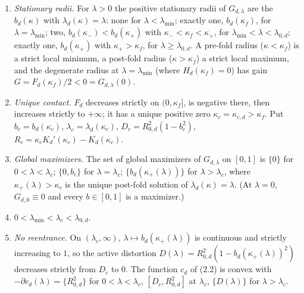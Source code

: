 \documentclass[
  11pt,
  a4paper,
]{article}
\newcounter{none} %
\begin{document}
\begin{enumerate}
\def\labelenumi{(\alph{enumi})}
\item
  \emph{Stationary radii.} For \(\lambda>0\) the positive stationary
  radii of \(G_{d,\allowbreak{}\lambda}\) are the \(b_d(\kappa)\) with
  \(\lambda_d(\kappa)=\lambda\): none for \(\lambda<\lambda_{\min}\);
  exactly one, \(b_d(\kappa_f)\), for \(\lambda=\lambda_{\min}\); two,
  \(b_d(\kappa_-)<b_d(\kappa_+)\) with \(\kappa_-<\kappa_f<\kappa_+\),
  for \(\lambda_{\min}<\lambda<\lambda_{0,\allowbreak{}d}\); exactly one,
  \(b_d(\kappa_+)\) with \(\kappa_+>\kappa_f\), for
  \(\lambda\ge\lambda_{0,\allowbreak{}d}\). A pre-fold radius (\(\kappa<\kappa_f\))
  is a strict local minimum, a post-fold radius (\(\kappa>\kappa_f\)) a
  strict local maximum, and the degenerate radius at
  \(\lambda=\lambda_{\min}\) (where \(H_d(\kappa_f)=0\)) has gain
  \(G=F_d(\kappa_f)/2<0=G_{d,\allowbreak{}\lambda}(0)\).
\item
  \emph{Unique contact.} \(F_d\) decreases strictly on \((0,\allowbreak{}\kappa_f]\),
  is negative there, then increases strictly to \(+\infty\); it has a
  unique positive zero \(\kappa_c=\kappa_{c,\allowbreak{}d}>\kappa_f\). Put
  \(b_c=b_d(\kappa_c)\), \(\lambda_c=\lambda_d(\kappa_c)\),
  \(D_c=R_{0,\allowbreak{}d}^2(1-b_c^2)\),
  \(R_c=\kappa_cK_d'(\kappa_c)-K_d(\kappa_c)\).
\item
  \emph{Global maximizers.} The set of global maximizers of
  \(G_{d,\allowbreak{}\lambda}\) on \([0,\allowbreak{}1]\) is \(\{0\}\) for
  \(0<\lambda<\lambda_c\); \(\{0,\allowbreak{}b_c\}\) for \(\lambda=\lambda_c\);
  \(\{b_d(\kappa_+(\lambda))\}\) for \(\lambda>\lambda_c\), where
  \(\kappa_+(\lambda)>\kappa_c\) is the unique post-fold solution of
  \(\lambda_d(\kappa)=\lambda\). (At \(\lambda=0\), \(G_{d,\allowbreak{}0}\equiv0\)
  and every \(b\in[0,\allowbreak{}1]\) is a maximizer.)
\item
  \(0<\lambda_{\min}<\lambda_c<\lambda_{0,\allowbreak{}d}\).
\item
  \emph{No reentrance.} On \((\lambda_c,\allowbreak{}\infty)\),
  \(\lambda\mapsto b_d(\kappa_+(\lambda))\) is continuous and strictly
  increasing to \(1\), so the active distortion
  \(D(\lambda)=R_{0,\allowbreak{}d}^2(1-b_d(\kappa_+(\lambda))^2)\) decreases
  strictly from \(D_c\) to \(0\). The function \(c_d\) of (2.2) is
  convex with \(-\partial c_d(\lambda)=\{R_{0,\allowbreak{}d}^2\}\) for
  \(0<\lambda<\lambda_c\), \([D_c,\allowbreak{}R_{0,\allowbreak{}d}^2]\) at \(\lambda_c\),
  \(\{D(\lambda)\}\) for \(\lambda>\lambda_c\).

\end{enumerate}
\end{document}
